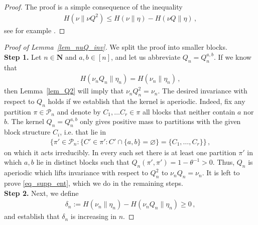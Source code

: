 \documentclass[a4paper,11pt]{article}
\newcommand{\NN}{\mathbf{N}}
\newcommand{\mP}{\mathcal{P}}
\numberwithin{equation}{section}
\begin{document}
\begin{proof}
The proof is a simple consequence of the inequality 
\begin{equation*}
\begin{aligned}
	H  ( \nu \| \nu Q^{2} )
	\leqslant 
 H ( \nu \| \eta) - H ( \nu Q \| \eta)  \,,
\end{aligned}
\end{equation*}
see for example \cite[Theorem~6]{HarremoesHolst2009}.
\end{proof}


\begin{proof}[Proof of Lemma~\ref{lem_nuQ_inv}]
	We split the proof into smaller blocks.\\

	\textbf{Step 1.}
Let $n \in \NN$ and $ a,b \in [n]$, and let us abbreviate $ Q_{n}= Q_{n}^{a,b}$.
If we know that 
\begin{equation}\label{eq_supp_ent}
\begin{aligned}
H ( \nu_{n}Q_{n}\| \eta_{n})	=
H( \nu_{n} \| \eta_{n} )\,,
\end{aligned}
\end{equation}
then Lemma~\ref{lem_Q2} will imply that $ \nu_{n}Q_{n}^{2}= \nu_{n}$. The desired invariance with respect to $ Q_{n}$ holds if we establish that the kernel is aperiodic.
Indeed, fix any partition $ \pi \in \mP_{n}$ and denote by $ C_{1}, \ldots C_{r} \in \pi $ all blocks that neither contain $ a$ nor $ b$. The kernel $ Q_{n}= Q_{n}^{a,b}$ only gives positive mass to partitions with the given block structure $ C_{i}$, i.e. that lie in 
\begin{equation*}
\begin{aligned}
\big\{\pi'\in\mathcal P_n:\{C'\in\pi':C'\cap\{a,b\}=\varnothing\}=\{C_1,\ldots,C_r\}\big\}\,,
\end{aligned}
\end{equation*}
on which it acts irreducibly. In every such set there is at least one partition $ \pi' $ in which $ a,b $ lie in distinct blocks such that $ Q_{n}( \pi', \pi' )= 1- \theta^{-1}>0$.
Thus, $ Q_{n}$ is aperiodic which lifts invariance with respect to $ Q_{n}^{2}$ to $ \nu_{n}Q_{n}= \nu_{n}$. It is left  to prove \eqref{eq_supp_ent}, which we do in the remaining steps.\\



\textbf{Step 2.}
Next, we define 
\begin{equation*}
\begin{aligned}
\delta_{n}:= 
H( \nu_{n} \| \eta_{n} ) - H ( \nu_{n}Q_{n}\| \eta_{n})\geqslant 0 \,,
\end{aligned}
\end{equation*}
and establish that $ \delta_{n}$ is increasing in $n$.


\end{proof}
\end{document}
